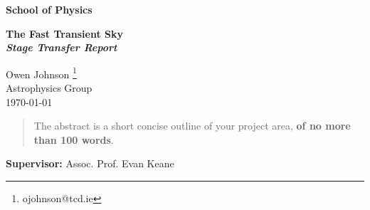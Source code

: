 \documentclass[a4paper,12pt]{article}
\newcounter{daggerfootnote}
\newcommand*{\daggerfootnote}[1]{%
    \setcounter{daggerfootnote}{\value{footnote}}%
    \renewcommand*{\thefootnote}{\fnsymbol{footnote}}%
    \footnote[2]{#1}%
    \setcounter{footnote}{\value{daggerfootnote}}%
    \renewcommand*{\thefootnote}{\arabic{footnote}}%
    }
\begin{document}
\begin{minipage}[b]{110mm}
        {\LARGE\bf School of Physics %
        \vspace*{17mm}}
\end{minipage}
\hfill
\begin{minipage}[t]{40mm}               
\end{minipage}
\par\noindent                                           %
\vspace*{2cm}
\begin{center}
        \Large\bf The Fast Transient Sky\\
        \normalsize \textit{Stage Transfer Report}
\end{center}
\vspace*{1.5cm}
\begin{center}
        Owen Johnson\daggerfootnote{ojohnson@tcd.ie}\\ 
        Astrophysics Group\\ 
        \monthyeardate\today            %
\end{center}
\vspace*{5mm}
%
%                       
\begin{abstract}
        The abstract is a short concise outline of your 
        project area, {\bf of no more than 100 words}.
\end{abstract}

\vspace*{1cm}


\vfill
{\bf Supervisor:} Assoc. Prof. Evan Keane          
\newpage
\setcounter{page}{1}                            %
\footruleheight{1pt}
\headruleheight{1pt}
\rhead{ \thepage}
\cfoot{}
%
{
\hypersetup{linkcolor=black}
\tableofcontents 
} 
\thispagestyle{empty}         
\newpage 
\end{document}

